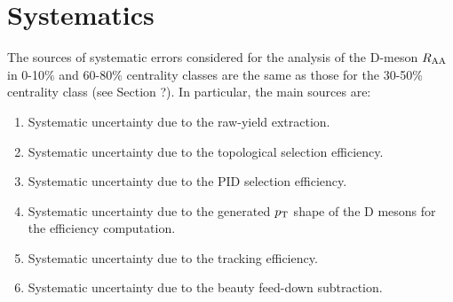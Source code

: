 \section{Systematics}
\label{sec:systematics_010_6080}
The sources of systematic errors considered for the analysis of the D-meson $R_{\rm AA}$ in 0-10$\%$ and 60-80$\%$ centrality classes are the same as those for the 30-50$\%$ centrality class (see Section ?). In particular, the main sources are:
\begin{enumerate}
\item Systematic uncertainty due to the raw-yield extraction.
\item Systematic uncertainty due to the topological selection efficiency.
\item Systematic uncertainty due to the PID selection efficiency.
\item Systematic uncertainty due to the generated $p_{\rm T}$ shape of the D mesons for the efficiency computation.
\item Systematic uncertainty due to the tracking efficiency.
\item Systematic uncertainty due to the beauty feed-down subtraction.
\end{enumerate}

